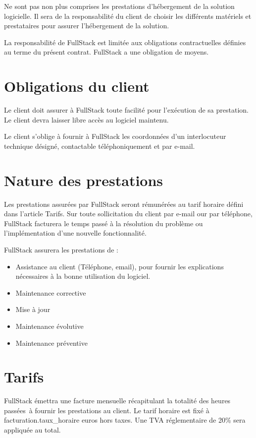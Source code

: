 \documentclass[11pt]{article}
\begin{document}
Ne sont pas non plus comprises les prestations d'hébergement de la solution logicielle. Il sera de la responsabilité du client de choisir les différents matériels et prestataires pour assurer l'hébergement de la solution.

La responsabilité de FullStack est limitée aux obligations contractuelles définies au terme du présent contrat. FullStack a une obligation de moyens.

\section{Obligations du client}

Le client doit assurer à FullStack toute facilité pour l'exécution de sa prestation. Le client devra laisser libre accès au logiciel maintenu.

Le client s'oblige à fournir à FullStack les coordonnées d'un interlocuteur technique désigné, contactable téléphoniquement et par e-mail.

\section{Nature des prestations}

Les prestations assurées par FullStack seront rémunérées au tarif horaire défini dans l'article Tarifs. Sur toute sollicitation du client par e-mail our par téléphone, FullStack facturera le temps passé à la résolution du problème ou l'implémentation d'une nouvelle fonctionnalité.

FullStack assurera les prestations de :

\begin{itemize}
  \item Assistance au client (Téléphone, email), pour fournir les explications nécessaires à la bonne utilisation du logiciel.
  \item Maintenance corrective
  \item Mise à jour
  \item Maintenance évolutive
  \item Maintenance préventive
\end{itemize}

\section{Tarifs}

FullStack émettra une facture mensuelle récapitulant la totalité des heures passées à fournir les prestations au client. Le tarif horaire est fixé à {{ facturation.taux_horaire }} euros hors taxes. Une TVA réglementaire de 20\% sera appliquée au total.
\end{document}
